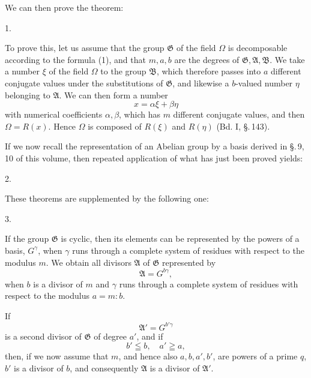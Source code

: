 
We can then prove the theorem:

1. 

To prove this, let us assume that the group $\mathfrak{G}$ of the
field $\Omega$ is decomposable according to the formula (1), and that $m, a, b$
are the degrees of $\mathfrak{G}, \mathfrak{A}, \mathfrak{B}$. We take a number $\xi$ of the field $\Omega$
 to the group $\mathfrak{B}$, which therefore passes into $a$ different
conjugate values under the substitutions of $\mathfrak{G}$, and likewise
a $b$-valued number $\eta$ belonging to $\mathfrak{A}$. We can
then form a number
\[
x = \alpha \xi + \beta \eta
\]
with  numerical coefficients $\alpha, \beta$, which has $m$ different
conjugate values, and then $\Omega = R(x)$. Hence
$\Omega$ is composed of $R(\xi)$ and $R(\eta)$ (Bd. I, \S.\,143).

If we now recall the representation of an Abelian group by
a basis derived in \S.\,9, 10 of this volume, then repeated
application of what has just been proved yields:

2. 

These theorems are supplemented by the following one:

3. 

If the group $\mathfrak{G}$ is cyclic, then its elements
can be represented by the powers of a basis, $G^\gamma$, when $\gamma$
runs through a complete system of residues with respect to the modulus $m$. We
obtain all divisors $\mathfrak{A}$ of $\mathfrak{G}$ represented by
\[
\mathfrak{A} = G^{b\gamma},
\]
when $b$ is a divisor of $m$ and $\gamma$ runs through a complete system of residues
with respect to the modulus $a = m : b$.

If
\[
\mathfrak{A}' = G^{b'\gamma}
\]
is a second divisor of $\mathfrak{G}$ of degree $a'$, and if
\[
b' \leqq b, \quad a' \geqq a,
\]
then, if we now assume that $m$, and hence also
$a, b, a', b'$, are powers of a prime $q$, $b'$ is a divisor of $b$,
and consequently $\mathfrak{A}$ is a divisor of $\mathfrak{A}'$.
